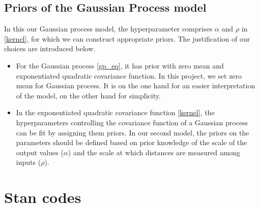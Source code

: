 \documentclass[a4paper]{artikel3}
\begin{document}
\subsection{Priors of the Gaussian Process model}
In this our Gaussian process model, the hyperparameter comprises $\alpha$ and $\rho$ in \eqref{kernel}, for which we can construct appropriate priors. The justification of our choices are introduced below. 
\begin{itemize}
    \item For the Gaussian process \eqref{gp_eq}, it has prior with zero mean and exponentiated quadratic covariance function. In this project, we set zero mean for Gaussian process. It is on the one hand for an easier interpretation of the model, on the other hand for simplicity.
    \item In the exponentiated quadratic covariance function \eqref{kernel}, the hyperparameters controlling the covariance function of a Gaussian process can be fit by assigning them priors. In our second model, the priors on the parameters should be defined based on prior knowledge of the scale of the output values ($\alpha$) and the scale at which distances are measured among inputs ($\rho$).
\end{itemize}


\section{Stan codes}
\end{document}
